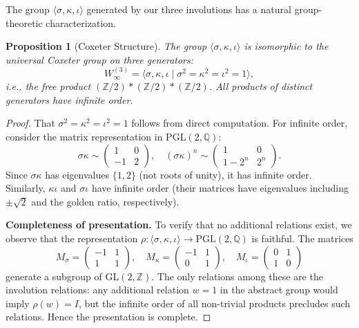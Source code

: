 \documentclass[11pt]{article}
\theoremstyle{plain}
\newtheorem{proposition}[theorem]{Proposition}
\theoremstyle{definition}
\theoremstyle{remark}
\begin{document}
The group $\langle \sigma, \kappa, \iota \rangle$ generated by our three involutions
has a natural group-theoretic characterization.

\begin{proposition}[Coxeter Structure]\label{prop:coxeter}
The group $\langle \sigma, \kappa, \iota \rangle$ is isomorphic to the universal
Coxeter group on three generators:
\[
W_\infty^{(3)} = \langle \sigma, \kappa, \iota \mid \sigma^2 = \kappa^2 = \iota^2 = 1 \rangle,
\]
i.e., the free product $(\mathbb{Z}/2) \ast (\mathbb{Z}/2) \ast (\mathbb{Z}/2)$.
All products of distinct generators have infinite order.
\end{proposition}

\begin{proof}
That $\sigma^2 = \kappa^2 = \iota^2 = 1$ follows from direct computation.
For infinite order, consider the matrix representation in $\mathrm{PGL}(2, \mathbb{Q})$:
\[
\sigma\kappa \sim \begin{pmatrix} 1 & 0 \\ -1 & 2 \end{pmatrix}, \quad
(\sigma\kappa)^n \sim \begin{pmatrix} 1 & 0 \\ 1-2^n & 2^n \end{pmatrix}.
\]
Since $\sigma\kappa$ has eigenvalues $\{1, 2\}$ (not roots of unity), it has infinite order.
Similarly, $\kappa\iota$ and $\sigma\iota$ have infinite order (their matrices have
eigenvalues including $\pm\sqrt{2}$ and the golden ratio, respectively).

\textbf{Completeness of presentation.} To verify that no additional relations exist,
we observe that the representation $\rho\colon \langle \sigma, \kappa, \iota \rangle \to \mathrm{PGL}(2, \mathbb{Q})$
is faithful. The matrices
\[
M_\sigma = \begin{pmatrix} -1 & 1 \\ 1 & 1 \end{pmatrix}, \quad
M_\kappa = \begin{pmatrix} -1 & 1 \\ 0 & 1 \end{pmatrix}, \quad
M_\iota = \begin{pmatrix} 0 & 1 \\ 1 & 0 \end{pmatrix}
\]
generate a subgroup of $\mathrm{GL}(2, \mathbb{Z})$. The only relations among these
are the involution relations: any additional relation $w = 1$ in the abstract group
would imply $\rho(w) = I$, but the infinite order of all non-trivial products
precludes such relations. Hence the presentation is complete.
\end{proof}
\end{document}
